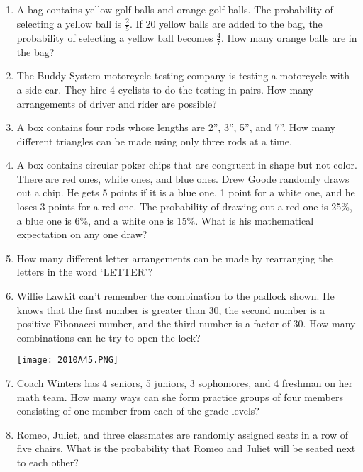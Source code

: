 \documentclass[../uilmath.tex]{subfiles}
\begin{document}
\begin{enumerate}[label=\bfseries\arabic*.]
    \item %
    A bag contains yellow golf balls and orange golf balls. The probability of selecting a yellow ball is $\frac{2}{5}$. If 20 yellow balls 
    are added to the bag, the probability of selecting a yellow ball becomes $\frac{4}{7}$. How many orange balls are in the bag?

    \item %
    The Buddy System motorcycle testing company is testing a motorcycle with a side car. They hire 4 cyclists 
    to do the testing in pairs. How many arrangements of driver and rider are possible?

    \item %
    A box contains four rods whose lengths are 2'', 3'', 5'', and 7''. How many different triangles can be made using only three rods at a time.

    \item %
    A box contains circular poker chips that are congruent in shape but not color. There are red ones, white ones, and blue ones.
    Drew Goode randomly draws out a chip. He gets 5 points if it is a blue one, 1 point for a white one, and he loses 3 points for a red one.
    The probability of drawing out a red one is 25\%, a blue one is 6\%, and a white one is 15\%. What is his mathematical expectation on any one draw?

    \item %
    How many different letter arrangements can be made by rearranging the letters in the word `LETTER'?

    \item %
    Willie Lawkit can't remember the combination to the padlock shown. He knows that the first number is greater than 30, 
    the second number is a positive Fibonacci number, and the third number is a factor of 30. How many combinations can he try to open the lock?
    \begin{center}
        \texttt{[image: 2010A45.PNG]}
    \end{center}

    \item %
    Coach Winters has 4 seniors, 5 juniors, 3 sophomores, and 4 freshman on her math team. How many ways can she form practice groups of 
    four members consisting of one member from each of the grade levels?

    \item %
    Romeo, Juliet, and three classmates are randomly assigned seats in a row of five chairs. What is the probability that Romeo and Juliet will be seated next to each other?


\end{enumerate}
\end{document}
